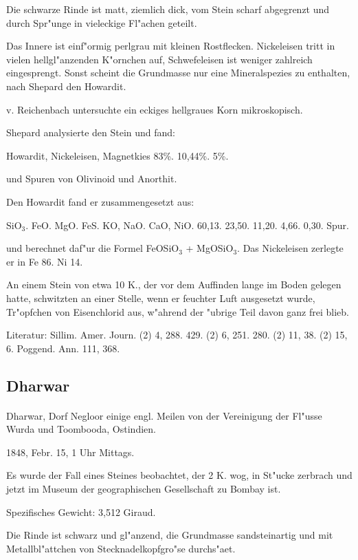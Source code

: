 \documentclass[a4paper, 11pt, oneside]{article}
\begin{document}
Die schwarze Rinde ist matt, ziemlich dick, vom Stein scharf abgegrenzt und durch Spr"unge in vieleckige Fl"achen geteilt.

Das Innere ist einf"ormig perlgrau mit kleinen Rostflecken. Nickeleisen tritt in vielen hellgl"anzenden K"ornchen auf, Schwefeleisen ist weniger zahlreich eingesprengt. Sonst scheint die Grundmasse nur eine Mineralspezies zu enthalten, nach Shepard den Howardit.

v. Reichenbach untersuchte ein eckiges hellgraues Korn mikroskopisch.

Shepard analysierte den Stein und fand:

Howardit, Nickeleisen, Magnetkies  
83\%. 10,44\%. 5\%.

und Spuren von Olivinoid und Anorthit.

Den Howardit fand er zusammengesetzt aus:

SiO$_{3}$. FeO. MgO. FeS. KO, NaO. CaO, NiO.  
60,13. 23,50. 11,20. 4,66. 0,30. Spur.

und berechnet daf"ur die Formel FeOSiO$_{3}$ + MgOSiO$_{3}$. Das Nickeleisen zerlegte er in Fe 86. Ni 14.

An einem Stein von etwa 10 K., der vor dem Auffinden lange im Boden gelegen hatte, schwitzten an einer Stelle, wenn er feuchter Luft ausgesetzt wurde, Tr"opfchen von Eisenchlorid aus, w"ahrend der "ubrige Teil davon ganz frei blieb.

\footnotesize
Literatur: Sillim. Amer. Journ. (2) 4, 288. 429. (2) 6, 251. 280. (2) 11, 38. (2) 15, 6. Poggend. Ann. 111, 368.

\subsection{Dharwar}
\normalsize
\paragraph{}
Dharwar, Dorf Negloor einige engl. Meilen von der Vereinigung der Fl"usse Wurda und Toombooda, Ostindien.

1848, Febr. 15, 1 Uhr Mittags.

Es wurde der Fall eines Steines beobachtet, der 2 K. wog, in St"ucke zerbrach und jetzt im Museum der geographischen Gesellschaft zu Bombay ist.

Spezifisches Gewicht: 3,512 Giraud.

Die Rinde ist schwarz und gl"anzend, die Grundmasse sandsteinartig und mit Metallbl"attchen von Stecknadelkopfgro"se durchs"aet.
\end{document}
